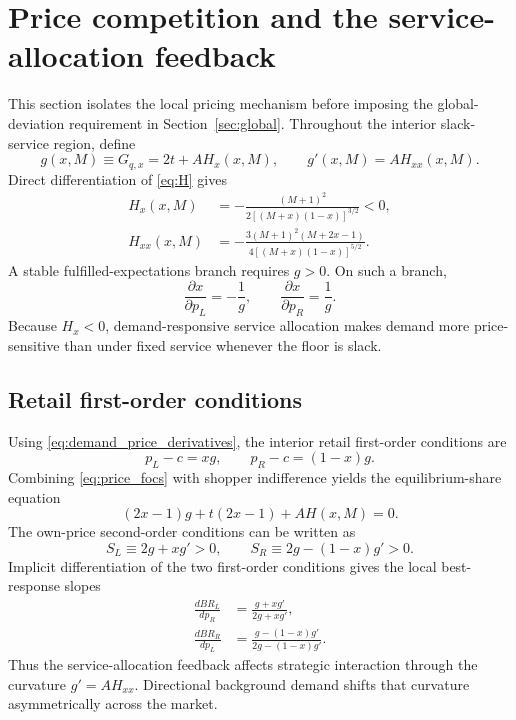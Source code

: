 \section{Price competition and the service-allocation feedback}\label{sec:equilibrium}

This section isolates the local pricing mechanism before imposing the global-deviation requirement in Section~\ref{sec:global}. Throughout the interior slack-service region, define
\begin{equation}
g(x,M)\equiv G_{q,x}=2t+A H_x(x,M),
\qquad
g'(x,M)=A H_{xx}(x,M).
\label{eq:g}
\end{equation}
Direct differentiation of \eqref{eq:H} gives
\begin{align}
H_x(x,M)
&=-\frac{(M+1)^2}{2[(M+x)(1-x)]^{3/2}}<0,\label{eq:Hx}\\
H_{xx}(x,M)
&=-\frac{3(M+1)^2(M+2x-1)}{4[(M+x)(1-x)]^{5/2}}.
\label{eq:Hxx}
\end{align}
A stable fulfilled-expectations branch requires $g>0$. On such a branch,
\begin{equation}
\frac{\partial x}{\partial p_L}=-\frac{1}{g},
\qquad
\frac{\partial x}{\partial p_R}=\frac{1}{g}.
\label{eq:demand_price_derivatives}
\end{equation}
Because $H_x<0$, demand-responsive service allocation makes demand more price-sensitive than under fixed service whenever the floor is slack.

\subsection{Retail first-order conditions}

Using \eqref{eq:demand_price_derivatives}, the interior retail first-order conditions are
\begin{equation}
p_L-c=xg,
\qquad
p_R-c=(1-x)g.
\label{eq:price_focs}
\end{equation}
Combining \eqref{eq:price_focs} with shopper indifference yields the equilibrium-share equation
\begin{equation}
(2x-1)g+t(2x-1)+AH(x,M)=0.
\label{eq:share_equilibrium}
\end{equation}
The own-price second-order conditions can be written as
\begin{equation}
S_L\equiv 2g+xg'>0,
\qquad
S_R\equiv 2g-(1-x)g'>0.
\label{eq:soc}
\end{equation}
Implicit differentiation of the two first-order conditions gives the local best-response slopes
\begin{align}
\frac{dBR_L}{dp_R}
&=\frac{g+xg'}{2g+xg'},\label{eq:brL}\\
\frac{dBR_R}{dp_L}
&=\frac{g-(1-x)g'}{2g-(1-x)g'}.
\label{eq:brR}
\end{align}
Thus the service-allocation feedback affects strategic interaction through the curvature $g'=AH_{xx}$. Directional background demand shifts that curvature asymmetrically across the market.

